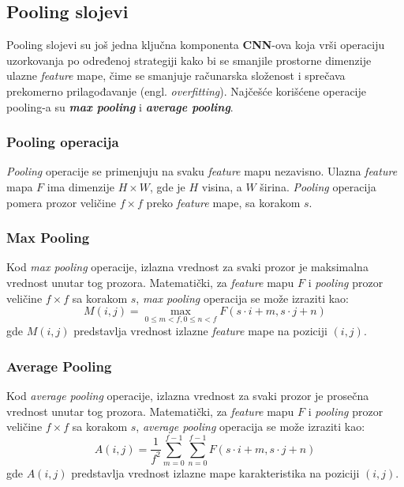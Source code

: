 \documentclass[12pt]{article}
\begin{document}
    \subsection*{Pooling slojevi}
   Pooling slojevi su još jedna ključna komponenta \textbf{CNN}-ova koja vrši operaciju uzorkovanja po određenoj strategiji kako bi 
   se smanjile prostorne dimenzije ulazne \textit{feature} mape, čime se smanjuje 
   računarska složenost i sprečava prekomerno prilagođavanje (engl. \textit{overfitting}). 
   Najčešće korišćene operacije pooling-a su \textbf{\textit{max pooling}} i \textbf{\textit{average pooling}}.
   \subsubsection*{Pooling operacija}
   \textit{Pooling} operacije se primenjuju na svaku \textit{feature} mapu nezavisno. 
   Ulazna \textit{feature} mapa \( F \) ima dimenzije \( H \times W \), gde je \( H \) visina, 
   a \( W \) širina. \textit{Pooling} operacija pomera prozor veličine \( f \times f \) preko \textit{feature} mape,
   sa korakom \( s \).
   \subsubsection*{Max Pooling}
   \vspace{-0.3cm}
   Kod \textit{max pooling} operacije, izlazna vrednost za svaki prozor je maksimalna vrednost 
   unutar tog prozora. Matematički, za \textit{feature} mapu \( F \) i \textit{pooling} prozor 
   veličine \( f \times f \) sa korakom \( s \), 
   \textit{max pooling} operacija se može izraziti kao:
   \[
   M(i, j) = \max_{0 \leq m < f, 0 \leq n < f} F(s \cdot i + m, s \cdot j + n)
   \]
   gde \( M(i, j) \) predstavlja vrednost izlazne \textit{feature} mape na poziciji \((i, j)\).
   \subsubsection*{Average Pooling}
   \vspace{-0.3cm}
   Kod \textit{average pooling} operacije, izlazna vrednost za svaki prozor je prosečna vrednost unutar tog 
   prozora. Matematički, za \textit{feature} mapu \( F \) i \textit{pooling} prozor veličine 
   \( f \times f \) sa korakom \( s \), 
   \textit{average pooling} operacija se može izraziti kao:
   \[
   A(i, j) = \frac{1}{f^2} \sum_{m=0}^{f-1} \sum_{n=0}^{f-1} F(s \cdot i + m, s \cdot j + n)
   \]
   gde \( A(i, j) \) predstavlja vrednost izlazne mape karakteristika na poziciji \((i, j)\).
\end{document}
